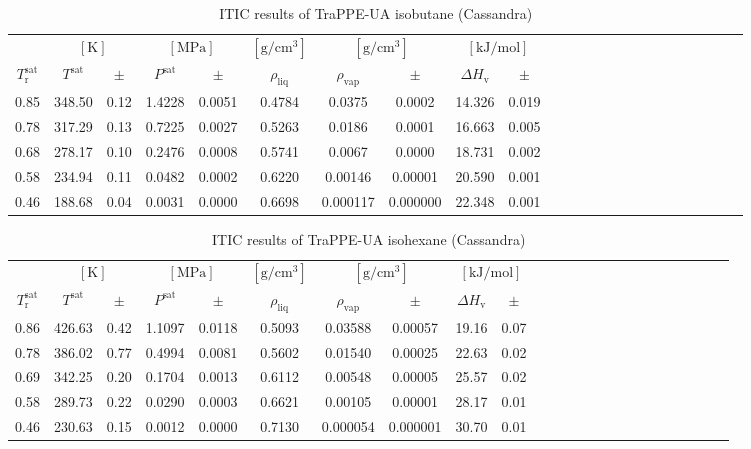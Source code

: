 \documentclass[%
 aip,
 jcp,
 sd,%
 amsmath,amssymb,
]{revtex4-1}
\begin{document}
\begin{table*}[]
\centering
\caption{
ITIC results of TraPPE-UA isobutane (Cassandra)
}
\label{tab:TraPPE-iC4-trappe}
\begin{ruledtabular}
\begin{tabular}{cccccccccccccccccccccccc}
 & \multicolumn{2}{c}{$[\mathrm{K}]$} &	 \multicolumn{2}{c}{$[\mathrm{MPa}]$} & $[\mathrm{g/cm^3}]$ & \multicolumn{2}{c}{$[\mathrm{g/cm^3}]$} & \multicolumn{2}{c}{$[\mathrm{kJ/mol}]$} \\
$T_\mathrm{r}^{\mathrm{sat}}$ & $T^{\mathrm{sat}}$ & $\pm$ & $P^{\mathrm{sat}}$ & $\pm$ & $\rho_{\mathrm{liq}}$ & $\rho_{\mathrm{vap}}$ & $\pm$ & $\Delta H_{\mathrm{v}}$ & $\pm$
 \\
\hline		
0.85	&	348.50	&	0.12	&	1.4228	&	0.0051	&	0.4784	&	0.0375	&	0.0002	&	14.326	&	0.019	\\
0.78	&	317.29	&	0.13	&	0.7225	&	0.0027	&	0.5263	&	0.0186	&	0.0001	&	16.663	&	0.005	\\
0.68	&	278.17	&	0.10	&	0.2476	&	0.0008	&	0.5741	&	0.0067	&	0.0000	&	18.731	&	0.002	\\
0.58	&	234.94	&	0.11	&	0.0482	&	0.0002	&	0.6220	&	0.00146	&	0.00001	&	20.590	&	0.001	\\
0.46	&	188.68	&	0.04	&	0.0031	&	0.0000	&	0.6698	&	0.000117	&	0.000000	&	22.348	&	0.001	\\
\end{tabular}
\end{ruledtabular}
\end{table*}


\begin{table*}[]
\centering
\caption{
ITIC results of TraPPE-UA isohexane (Cassandra)
}
\label{tab:TraPPE-iC6-trappegc}
\begin{ruledtabular}
\begin{tabular}{cccccccccccccccccccccccc}
 & \multicolumn{2}{c}{$[\mathrm{K}]$} &	 \multicolumn{2}{c}{$[\mathrm{MPa}]$} & $[\mathrm{g/cm^3}]$ & \multicolumn{2}{c}{$[\mathrm{g/cm^3}]$} & \multicolumn{2}{c}{$[\mathrm{kJ/mol}]$} \\
$T_\mathrm{r}^{\mathrm{sat}}$ & $T^{\mathrm{sat}}$ & $\pm$ & $P^{\mathrm{sat}}$ & $\pm$ & $\rho_{\mathrm{liq}}$ & $\rho_{\mathrm{vap}}$ & $\pm$ & $\Delta H_{\mathrm{v}}$ & $\pm$
 \\
\hline		
0.86	&	426.63	&	0.42	&	1.1097	&	0.0118	&	0.5093	&	0.03588	&	0.00057	&	19.16	&	0.07	\\
0.78	&	386.02	&	0.77	&	0.4994	&	0.0081	&	0.5602	&	0.01540	&	0.00025	&	22.63	&	0.02	\\
0.69	&	342.25	&	0.20	&	0.1704	&	0.0013	&	0.6112	&	0.00548	&	0.00005	&	25.57	&	0.02	\\
0.58	&	289.73	&	0.22	&	0.0290	&	0.0003	&	0.6621	&	0.00105	&	0.00001	&	28.17	&	0.01	\\
0.46	&	230.63	&	0.15	&	0.0012	&	0.0000	&	0.7130	&	0.000054	&	0.000001	&	30.70	&	0.01	\\
\end{tabular}
\end{ruledtabular}
\end{table*}
\end{document}
